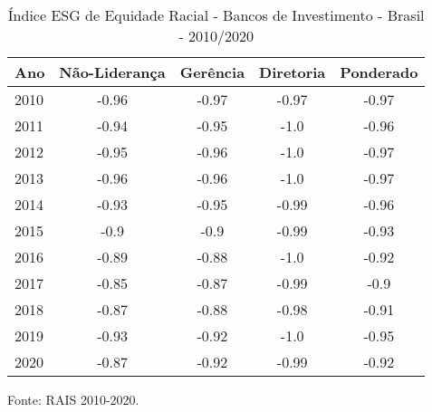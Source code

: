 \begin{table}[htb!]
\centering
\caption{Índice ESG de Equidade Racial - Bancos de Investimento - Brasil - 2010/2020}
\begin{tabular}{lcccc}
\hline
Ano  & Não-Liderança & Gerência & Diretoria & Ponderado \\ \hline
2010 & -0.96          & -0.97    & -0.97     & -0.97     \\
2011 & -0.94          & -0.95    & -1.0      & -0.96     \\
2012 & -0.95          & -0.96    & -1.0      & -0.97     \\
2013 & -0.96          & -0.96    & -1.0      & -0.97     \\
2014 & -0.93          & -0.95    & -0.99     & -0.96     \\
2015 & -0.9           & -0.9     & -0.99     & -0.93     \\
2016 & -0.89          & -0.88    & -1.0      & -0.92     \\
2017 & -0.85          & -0.87    & -0.99     & -0.9      \\
2018 & -0.87          & -0.88    & -0.98     & -0.91     \\
2019 & -0.93          & -0.92    & -1.0      & -0.95     \\
2020 & -0.87          & -0.92    & -0.99     & -0.92      \\ \hline
\end{tabular}
\begin{floatnotes}
\item [Fonte:] RAIS 2010-2020.
\end{floatnotes}
\end{table}